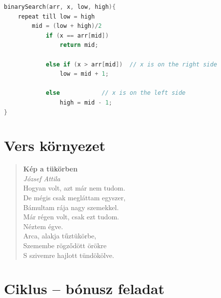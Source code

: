 \documentclass[11pt]{book}
\theoremstyle{definition}
\newenvironment{modverse}[2]%
{%
	\begin{verse}
	\begin{center}
	\textbf{#1} \\
	\textit{#2} \\[0.5cm]
	
}%
{\end{center}\end{verse}}
\begin{document}
\hulipsum[1-8]

\begin{center}
\lstset{%
    caption=Descriptive Caption Text,
    basicstyle=\ttfamily\footnotesize\bfseries,
    frame=tb
  }
\begin{minipage}{\textwidth}
\begin{lstlisting}[language=c, numbers=right, showspaces=true, stepnumber=2, tabsize=2, frame=tlBR, caption={Bináris keresés C-ben}]
binarySearch(arr, x, low, high){
	repeat till low = high
		mid = (low + high)/2
			if (x == arr[mid])
				return mid;

			else if (x > arr[mid])	// x is on the right side
				low = mid + 1;

			else			// x is on the left side
				high = mid - 1;
}
\end{lstlisting}
\end{minipage}
\end{center}

\hulipsum[1-8]

\chapter{Vers környezet}

\begin{modverse}{Kép a tükörben}{József Attila}
Hogyan volt, azt már nem tudom.\\
De mégis csak megláttam egyszer,\\
Bámultam rája nagy szemekkel.\\
Már régen volt, csak ezt tudom.\\[0.5cm]

Néztem égve.\\
Arca, alakja tűztükörbe,\\
Szemembe rögződött örökre\\
S szivemre hajlott tündökölve.\\
\end{modverse}


\chapter{Ciklus -- bónusz feladat}

\setcounter{index}{1}
{%
\ifodd \theindex {\textcolor{black}{\theindex}} \else {\textcolor{red}{\theindex}} \fi
{}%
}
\end{document}
